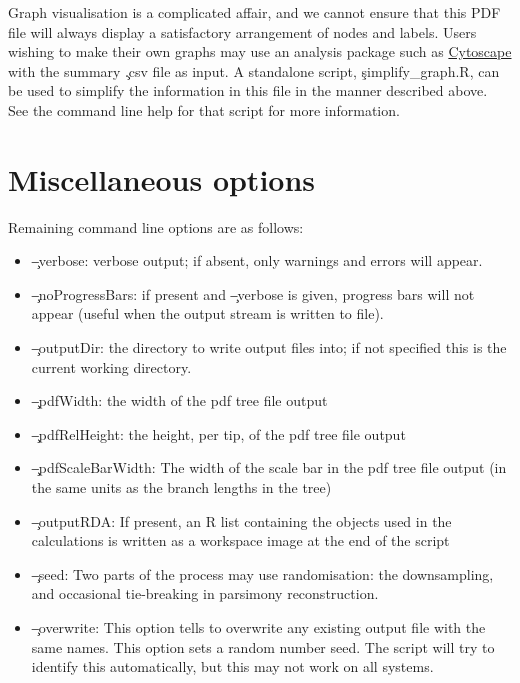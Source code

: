 Graph visualisation is a complicated affair, and we cannot ensure that this PDF file will always display a satisfactory arrangement of nodes and labels. Users wishing to make their own graphs may use an analysis package such as \href{http://www.cytoscape.org/}{Cytoscape} with the summary \c{.csv} file as input. A standalone script, \c{simplify\_graph.R}, can be used to simplify the information in this file in the manner described above. See the command line help for that script for more information.

\section{Miscellaneous options}

Remaining command line options are as follows:
\begin{itemize}
\item \c{--verbose}: verbose output; if absent, only warnings and errors will appear.
\item \c{--noProgressBars}: if present and \c{--verbose} is given, progress bars will not appear (useful when the output stream is written to file).
\item \c{--outputDir}: the directory to write output files into; if not specified this is the current working directory.
\item \c{--pdfWidth}: the width of the pdf tree file output
\item \c{--pdfRelHeight}: the height, per tip, of the pdf tree file output
\item \c{--pdfScaleBarWidth}: The width of the scale bar in the pdf tree file output (in the same units as the branch lengths in the tree)
\item \c{--outputRDA}: If present, an R list containing the objects used in the calculations is written as  a workspace image at the end of the script
\item \c{--seed}: Two parts of the process may use randomisation: the downsampling, and occasional tie-breaking in parsimony reconstruction.
\item \c{--overwrite}: This option tells \pat to overwrite any existing output file with the same names.
This option sets a random number seed.
The script will try to identify this automatically, but this may not work on all systems.
\end{itemize}
